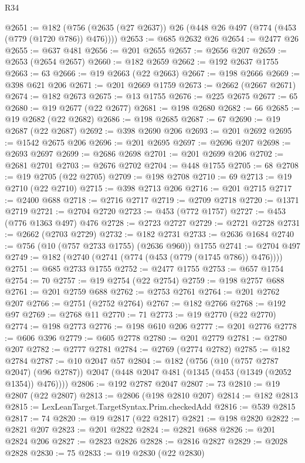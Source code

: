 \begin{lexlean}{R34}
\begin{coremodule}
@2651 := @182 (@756 (@2635 (@27 @2637)) @26 (@448 @26 @497 (@774 (@453 (@779 (@1720 @786)) @476))))
@2653 := @685 @2632 @26
@2654 := @2477 @26
@2655 := @637 @481
@2656 := @201 @2655
@2657 := @2656 @207
@2659 := @2653 (@2654 @2657)
@2660 := @182 @2659
@2662 := @192 @2637 @1755
@2663 := 63
@2666 := @19 @2663 (@22 @2663)
@2667 := @198 @2666
@2669 := @398 @621 @206
@2671 := @201 @2669 @1759
@2673 := @2662 (@2667 @2671)
@2674 := @182 @2673
@2675 := @13 @1755
@2676 := @225 @2675
@2677 := 65
@2680 := @19 @2677 (@22 @2677)
@2681 := @198 @2680
@2682 := 66
@2685 := @19 @2682 (@22 @2682)
@2686 := @198 @2685
@2687 := 67
@2690 := @19 @2687 (@22 @2687)
@2692 := @398 @2690 @206
@2693 := @201 @2692
@2695 := @1542 @2675 @206
@2696 := @201 @2695
@2697 := @2696 @207
@2698 := @2693 @2697
@2699 := @2686 @2698
@2701 := @201 @2699 @206
@2702 := @2681 @2701
@2703 := @2676 @2702
@2704 := @448 @1755
@2705 := 68
@2708 := @19 @2705 (@22 @2705)
@2709 := @198 @2708
@2710 := 69
@2713 := @19 @2710 (@22 @2710)
@2715 := @398 @2713 @206
@2716 := @201 @2715
@2717 := @2400 @688
@2718 := @2716 @2717
@2719 := @2709 @2718
@2720 := @1371 @2719
@2721 := @2704 @2720
@2723 := @453 (@772 @1757)
@2727 := @453 (@776 @1363 @497) @476
@2728 := @2723 @2727
@2729 := @2721 @2728
@2731 := @2662 (@2703 @2729)
@2732 := @182 @2731
@2733 := @2636 @1684
@2740 := @756 (@10 (@757 @2733 @1755) (@2636 @960)) @1755
@2741 := @2704 @497
@2749 := @182 (@2740 (@2741 (@774 (@453 (@779 (@1745 @786)) @476))))
@2751 := @685 @2733 @1755
@2752 := @2477 @1755
@2753 := @657 @1754
@2754 := 70
@2757 := @19 @2754 (@22 @2754)
@2759 := @198 @2757 @688
@2761 := @201 @2759 @688
@2762 := @2753 @2761
@2764 := @201 @2762 @207
@2766 := @2751 (@2752 @2764)
@2767 := @182 @2766
@2768 := @192 @97
@2769 := @2768 @11
@2770 := 71
@2773 := @19 @2770 (@22 @2770)
@2774 := @198 @2773
@2776 := @198 @610 @206
@2777 := @201 @2776
@2778 := @606 @396
@2779 := @605 @2778
@2780 := @201 @2779
@2781 := @2780 @207
@2782 := @2777 @2781
@2784 := @2769 (@2774 @2782)
@2785 := @182 @2784
@2787 := @10 @2047 @57
@2804 := @182
    (@756
      (@10 (@757 @2787 @2047) (@96 @2787))
      @2047
      (@448 @2047 @481 (@1345 (@453 (@1349 (@2052 @1354)) @476))))
@2806 := @192 @2787 @2047
@2807 := 73
@2810 := @19 @2807 (@22 @2807)
@2813 := @2806 (@198 @2810 @207)
@2814 := @182 @2813
@2815 := LexLeanTarget.TargetSyntax.Prim.checkedAdd
@2816 := @539 @2815
@2817 := 74
@2820 := @19 @2817 (@22 @2817)
@2821 := @198 @2820
@2822 := @2821 @207
@2823 := @201 @2822
@2824 := @2821 @688
@2826 := @201 @2824 @206
@2827 := @2823 @2826
@2828 := @2816 @2827
@2829 := @2028 @2828
@2830 := 75
@2833 := @19 @2830 (@22 @2830)

\end{coremodule}
\end{lexlean}
